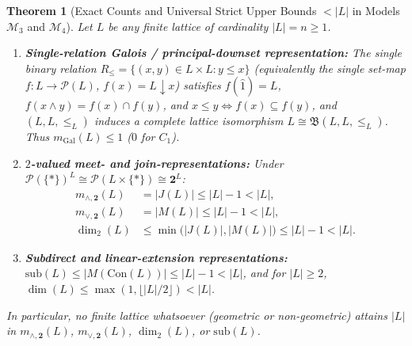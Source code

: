 \documentclass[11pt]{article}
\newtheorem{theorem}{Theorem}[section]
\theoremstyle{definition}
\theoremstyle{remark}
\newcommand{\Con}{\mathrm{Con}}
\newcommand{\Pow}{\mathcal{P}}
\newcommand{\BoolTwo}{\mathbf{2}}
\begin{document}
\begin{theorem}[Exact Counts and Universal Strict Upper Bounds $< |L|$ in Models $\mathcal{M}_3$ and $\mathcal{M}_4$]
\label{thm:strict-bounds}
Let $L$ be any finite lattice of cardinality $|L| = n \ge 1$.
\begin{enumerate}
\item[(1)] \textbf{Single-relation Galois / principal-downset representation:} The single binary relation $R_\le = \{(x,y) \in L \times L : y \le x\}$ (equivalently the single set-map $f \colon L \to \Pow(L)$, $f(x) = L \downarrow x$) satisfies $f(\hat{1}) = L$, $f(x \wedge y) = f(x) \cap f(y)$, and $x \le y \iff f(x) \subseteq f(y)$, and $(L, L, {\le_L})$ induces a complete lattice isomorphism $L \cong \mathfrak{B}(L,L,{\le_L})$. Thus $m_{\mathrm{Gal}}(L) \le 1$ ($0$ for $C_1$).
\item[(2)] \textbf{$2$-valued meet- and join-representations:} Under $\Pow(\{\ast\})^L \cong \Pow(L \times \{\ast\}) \cong \BoolTwo^L$:
  \begin{align*}
    m_{\wedge,\BoolTwo}(L) &= |J(L)| \le |L| - 1 < |L|, \\
    m_{\vee,\BoolTwo}(L) &= |M(L)| \le |L| - 1 < |L|, \\
    \dim_2(L) &\le \min\bigl(|J(L)|, |M(L)|\bigr) \le |L| - 1 < |L|.
  \end{align*}
\item[(3)] \textbf{Subdirect and linear-extension representations:} $\mathrm{sub}(L) \le |M(\Con(L))| \le |L| - 1 < |L|$, and for $|L| \ge 2$, $\dim(L) \le \max(1, \lfloor |L|/2 \rfloor) < |L|$.
\end{enumerate}
In particular, \emph{no finite lattice whatsoever} (geometric or non-geometric) attains $|L|$ in $m_{\wedge,\BoolTwo}(L)$, $m_{\vee,\BoolTwo}(L)$, $\dim_2(L)$, or $\mathrm{sub}(L)$.
\end{theorem}
\end{document}
